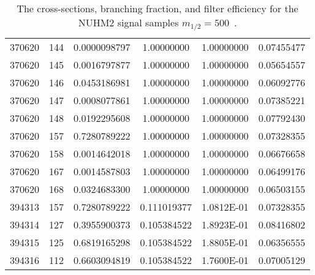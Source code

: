 \begin{table}[htp]
{{\begin{tabular}{cccccc}
370620 & 144 & 0.0000098797 & 1.00000000 & 1.00000000 & 0.07455477\\
370620 & 145 & 0.0016797877 & 1.00000000 & 1.00000000 & 0.05654557\\
370620 & 146 & 0.0453186981 & 1.00000000 & 1.00000000 & 0.06092776\\
370620 & 147 & 0.0008077861 & 1.00000000 & 1.00000000 & 0.07385221\\
370620 & 148 & 0.0192295608 & 1.00000000 & 1.00000000 & 0.07792430\\
370620 & 157 & 0.7280789222 & 1.00000000 & 1.00000000 & 0.07328355\\
370620 & 158 & 0.0014642018 & 1.00000000 & 1.00000000 & 0.06676658\\
370620 & 167 & 0.0014587803 & 1.00000000 & 1.00000000 & 0.06499176\\
370620 & 168 & 0.0324683300 & 1.00000000 & 1.00000000 & 0.06503155\\
394313 & 157 & 0.7280789222 & 0.111019377 & 1.0812E-01 & 0.07328355\\
394314 & 127 & 0.3955900373 & 0.105384522 & 1.8923E-01 & 0.08416802\\
394315 & 125 & 0.6819165298 & 0.105384522 & 1.8805E-01 & 0.06356555\\
394316 & 112 & 0.6603094819 & 0.105384522 & 1.7600E-01 & 0.07005129\\
\hline
\hline
\end{tabular}
}
}
\caption{The cross-sections, branching fraction, and filter efficiency for the NUHM2 signal samples $m_{1/2} = 500$~{\GeV}.}
\label{tab:app_xsec_m12_500}
\end{table}%

